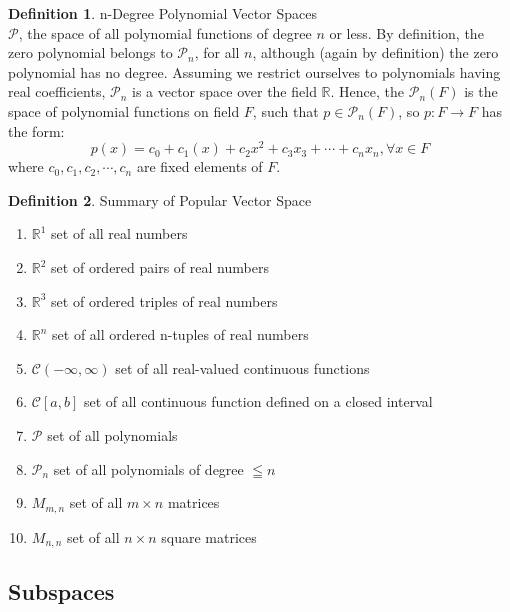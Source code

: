 \documentclass{book}
\theoremstyle{definition}
\newtheorem{definition}{Definition}[section]
\theoremstyle{remark}
\newcommand{\bb}[1]{\mathbb{#1}}
\begin{document}
\begin{definition}
n-Degree Polynomial Vector Spaces \\

    $\mathcal{P}$, the space of all polynomial functions of degree $n$ or less. By definition, the zero polynomial belongs to $\mathcal{P}_n$, for all $n$, although (again by definition) the zero polynomial has no degree. Assuming we restrict ourselves to polynomials having real coefficients, $\mathcal{P}_n$ is a vector space over the field $\bb{R}$. Hence, the $\mathcal{P}_n(F)$ is the space of polynomial functions on field $F$, such that $p \in \mathcal{P}_n(F)$, so $p: F \to F$ has the form: 
        \begin{equation*}
            p(x) = c_0 + c_1(x) +c_2x^2 + c_3x_3 + \cdots + c_nx_n, \forall x \in F
        \end{equation*}
    where $c_0, c_1, c_2, \cdots, c_n$ are fixed elements of $F$.
\end{definition}


\begin{definition}
Summary of Popular Vector Space \\

    \begin{enumerate}
        \item $\bb{R}^1$ set of all real numbers
        \item $\bb{R}^2$ set of ordered pairs of real numbers
        \item $\bb{R}^3$ set of ordered triples of real numbers
        \item $\bb{R}^n$ set of all ordered n-tuples of real numbers
        \item $\mathcal{C}(- \infty, \infty)$ set of all real-valued continuous functions
        \item $\mathcal{C}[a,b]$ set of all continuous function defined on a closed interval
        \item $\mathcal{P}$ set of all polynomials
        \item $\mathcal{P}_n$ set of all polynomials of degree $\leqq n$
        \item $M_{m,n}$ set of all $m \times n$ matrices 
        \item $M_{n,n}$ set of all $n \times n$ square matrices
    \end{enumerate}
\end{definition}




\newpage
\subsection{Subspaces}
\end{document}
